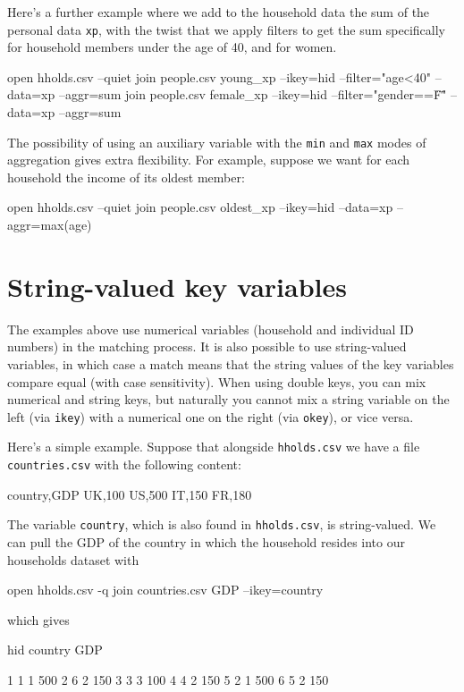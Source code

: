 Here's a further example where we add to the household data the sum of
the personal data \texttt{xp}, with the twist that we apply filters to
get the sum specifically for household members under the age of 40,
and for women.
\begin{code}
open hholds.csv --quiet
join people.csv young_xp --ikey=hid --filter="age<40" --data=xp --aggr=sum
join people.csv female_xp --ikey=hid --filter="gender==\"F\"" --data=xp --aggr=sum
\end{code}

The possibility of using an auxiliary variable with the \texttt{min}
and \texttt{max} modes of aggregation gives extra flexibility. For
example, suppose we want for each household the income of its oldest
member:
\begin{code}
open hholds.csv --quiet
join people.csv oldest_xp --ikey=hid --data=xp --aggr=max(age)
\end{code}


\section{String-valued key variables}
\label{sec:join-strings}

The examples above use numerical variables (household and individual
ID numbers) in the matching process. It is also possible to use
string-valued variables, in which case a match means that the string
values of the key variables compare equal (with case sensitivity). 
When using double keys, you can mix numerical and string keys, but
naturally you cannot mix a string variable on the left (via
\texttt{ikey}) with a numerical one on the right (via \texttt{okey}),
or vice versa.

Here's a simple example. Suppose that alongside \texttt{hholds.csv} we
have a file \texttt{countries.csv} with the following content:
\begin{code}
 country,GDP
 UK,100
 US,500
 IT,150
 FR,180
\end{code}

The variable \texttt{country}, which is also found in
\texttt{hholds.csv}, is string-valued. We can pull the GDP of the
country in which the household resides into our households dataset
with
\begin{code}
open hholds.csv -q
join countries.csv GDP --ikey=country
\end{code}
which gives
\begin{code}
           hid      country          GDP

1            1            1          500
2            6            2          150
3            3            3          100
4            4            2          150
5            2            1          500
6            5            2          150
\end{code}


